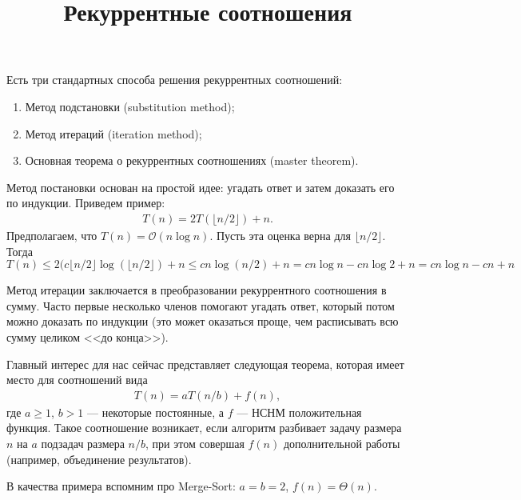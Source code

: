 \documentclass[11pt,draft]{article}
\begin{document}
\title{Рекуррентные соотношения}
\maketitle
Есть три стандартных способа решения рекуррентных соотношений:
\begin{enumerate}
  \item Метод подстановки (substitution method);
  \item Метод итераций (iteration method);
  \item Основная теорема о рекуррентных соотношениях (master theorem).
\end{enumerate}

Метод постановки основан на простой идее: угадать ответ и затем доказать его по индукции.
Приведем пример:
\begin{gather*}
  T(n) = 2 T(\lfloor n / 2 \rfloor) + n.
\end{gather*}
Предполагаем, что $T(n) = \mathcal O( n \log n)$.
Пусть эта оценка верна для $\lfloor n / 2 \rfloor$.
Тогда
\begin{equation}
  T(n) \leqslant 2 ( c \lfloor n / 2 \rfloor \log(\lfloor n / 2 \rfloor) + n
  \leqslant cn \log (n / 2) + n = cn \log n - cn \log 2 + n = cn \log n - cn + n 
\end{equation}

Метод итерации заключается в преобразовании рекуррентного соотношения в сумму. Часто первые несколько членов
помогают угадать ответ, который потом можно доказать по индукции (это может оказаться проще, чем расписывать всю сумму целиком <<до конца>>).

Главный интерес для нас сейчас представляет следующая теорема, которая имеет место для соотношений вида
\begin{gather}
  \label{main_recur}
  T(n) = aT(n / b) + f(n),
\end{gather}
где $a \geqslant 1$, $b > 1$ --- некоторые постоянные, а $f$ --- НСНМ положительная функция.
Такое соотношение возникает, если алгоритм разбивает задачу размера $n$ на $a$ подзадач размера $n / b$, при этом совершая $f(n)$ дополнительной работы
(например, объединение результатов).

В качества примера вспомним про {\cal Merge-Sort}: $a = b = 2$, $f(n) = \Theta(n)$.
\end{document}
